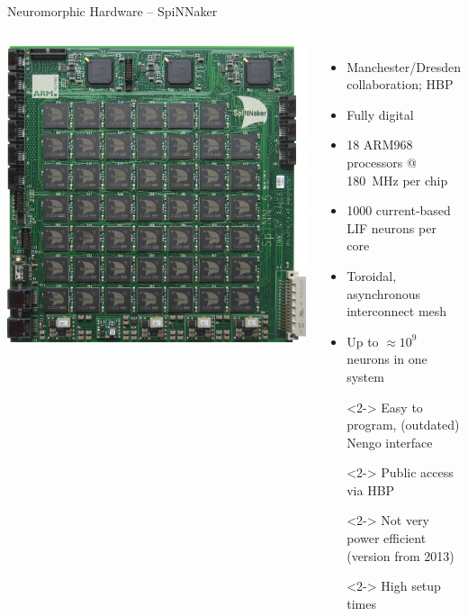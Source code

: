 \documentclass[handout,aspectratio=169]{beamer}
\begin{document}
\begin{frame}{Neuromorphic Hardware -- SpiNNaker}
	\centering
	\begin{columns}
		\includegraphics[width=\textwidth]{media/spinnaker_48board.jpg}
		\begin{itemize}
			\setlength{\itemsep}{0.25cm}
			\item Manchester/Dresden collaboration; HBP
			\item Fully digital
			\item 18 ARM968 processors @ \SI{180}{\mega\hertz} per chip
			\item 1000 current-based LIF neurons per core
			\item Toroidal, asynchronous interconnect mesh
			\item Up to $\approx 10^{9}$ neurons in one system
			\item[\OPlus]<2-> Easy to program, (outdated) Nengo interface
			\item[\OPlus]<2-> Public access via HBP
			\item[\OMeh]<2-> Not very power efficient (version from 2013)
			\item[\OMinus]<2-> High setup times
		\end{itemize}
	\end{columns}
\end{frame}
\end{document}
